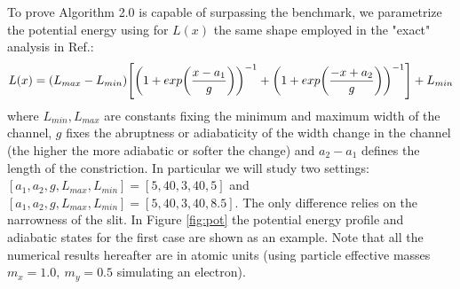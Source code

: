 \documentclass[11pt, a4paper]{article} %
\begin{document}
To prove Algorithm 2.0 is capable of surpassing the benchmark, we parametrize the potential energy using for $L(x)$ the same shape employed in the "exact" analysis in Ref.\cite{Dev}:
$$
L(x)=(L_{max}-L_{min})\qty[\qty(1+exp\qty(\frac{x-a_1}{g}))^{-1}+\qty(1+exp\qty(\frac{-x+a_2}{g}))^{-1}]+L_{min}
$$
where $L_{min}, L_{max}$ are constants fixing the minimum and maximum width of the channel, $g$ fixes the abruptness or adiabaticity of the width change in the channel (the higher the more adiabatic or softer the change) and $a_2-a_1$ defines the length of the constriction. In particular we will study two settings: $[a_1,a_2,g,L_{max},L_{min}]=[5,40,3,40,5]$ and $[a_1,a_2,g,L_{max},L_{min}]=[5,40,3,40,8.5]$. The only difference relies on the narrowness of the slit. In Figure \ref{fig:pot} the potential energy profile and adiabatic states for the first case are shown as an example. Note that all the numerical results hereafter are in atomic units (using particle effective masses $m_x=1.0,\ m_y=0.5$ simulating an electron).
\end{document}
